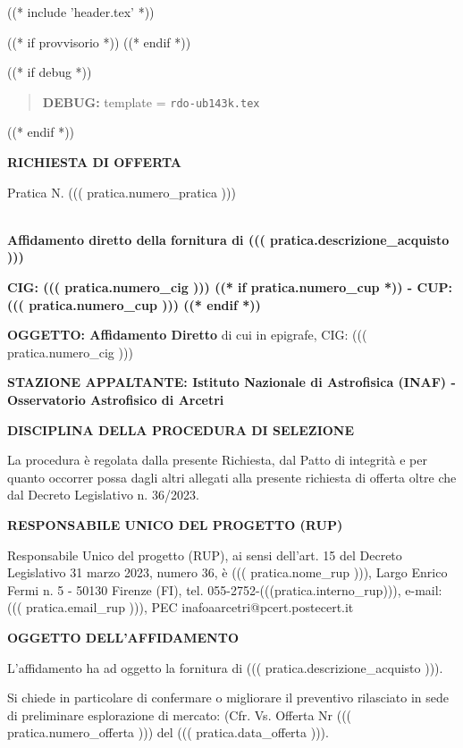 
((* include 'header.tex' *))

((* if provvisorio *))
((* endif *))



\topaddr

((* if debug *))
\begin{quotation}
	\textbf{DEBUG:} template = \texttt{rdo-ub143k.tex}
\end{quotation}
((* endif *))

\begin{center}
\textbf{RICHIESTA DI OFFERTA}
\end{center}

Pratica N. ((( pratica.numero_pratica )))


~\\
\textbf{Affidamento diretto della fornitura di ((( pratica.descrizione_acquisto )))}

\textbf{CIG: ((( pratica.numero_cig )))
((* if pratica.numero_cup *)) - CUP: ((( pratica.numero_cup ))) ((* endif *))}

\textbf{OGGETTO: Affidamento Diretto} di cui in epigrafe, CIG: ((( pratica.numero_cig )))

\textbf{STAZIONE APPALTANTE: Istituto Nazionale di Astrofisica (INAF) - Osservatorio Astrofisico di Arcetri}

\textbf{DISCIPLINA DELLA PROCEDURA DI SELEZIONE}

La procedura è regolata dalla presente Richiesta, dal Patto di integrità
e per quanto occorrer possa dagli altri allegati alla presente richiesta
di offerta oltre che dal Decreto Legislativo n. 36/2023.


\textbf{RESPONSABILE UNICO DEL PROGETTO (RUP)}

Responsabile Unico del progetto (RUP), ai sensi dell'art. 15 del
Decreto Legislativo 31 marzo 2023, numero 36, è
 ((( pratica.nome_rup ))), Largo Enrico Fermi n. 5 - 50130 Firenze
 (FI), tel. 055-2752-(((pratica.interno_rup))),
e-mail: ((( pratica.email_rup ))), PEC inafoaarcetri@pcert.postecert.it


\textbf{OGGETTO DELL'AFFIDAMENTO}

L'affidamento ha ad oggetto la fornitura di  ((( pratica.descrizione_acquisto ))).

Si chiede in particolare di confermare o migliorare il preventivo
rilasciato in sede di preliminare esplorazione di mercato: 
(Cfr. Vs. Offerta Nr ((( pratica.numero_offerta ))) del ((( pratica.data_offerta ))).

